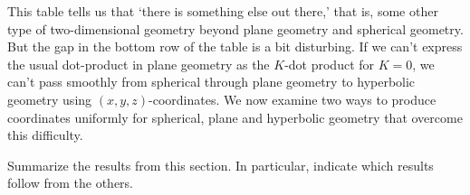 \documentclass{ximera}
\begin{document}
This table tells us that `there is something else out there,' that is,
some other type of two-dimensional geometry beyond plane geometry and
spherical geometry. But the gap in the bottom row of the table is a
bit disturbing. If we can't express the usual dot-product in plane
geometry as the $K$-dot product for $K=0$, we can't pass smoothly from
spherical through plane geometry to hyperbolic geometry using $\left(
x,y,z\right) $-coordinates. We now examine two ways to produce
coordinates uniformly for spherical, plane and hyperbolic geometry
that overcome this difficulty.



\begin{problem}
Summarize the results from this section. In particular, indicate which
results follow from the others.
\begin{freeResponse}
\end{freeResponse}
\end{problem}
\end{document}
